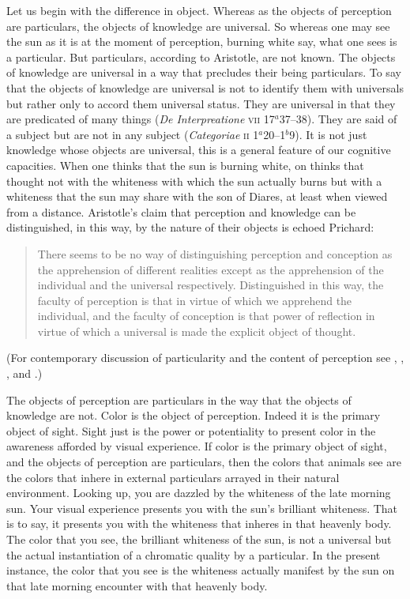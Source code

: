 Let us begin with the difference in object. Whereas as the objects of perception are particulars, the objects of knowledge are universal. So whereas one may see the sun as it is at the moment of perception, burning white say, what one sees is a particular. But particulars, according to Aristotle, are not known. The objects of knowledge are universal in a way that precludes their being particulars. To say that the objects of knowledge are universal is not to identify them with universals but rather only to accord them universal status. They are universal in that they are predicated of many things (\emph{De Interpreatione} \textsc{vii} 17\( ^{a} \)37--38). They are said of a subject but are not in any subject (\emph{Categoriae} \textsc{ii} 1\( ^{a} \)20--1\( ^{b} \)9). It is not just knowledge whose objects are universal, this is a general feature of our cognitive capacities. When one thinks that the sun is burning white, on thinks that thought not with the whiteness with which the sun actually burns but with a whiteness that the sun may share with the son of Diares, at least when viewed from a distance. Aristotle's claim that perception and knowledge can be distinguished, in this way, by the nature of their objects is echoed Prichard:
\begin{quote}
	There seems to be no way of distinguishing perception and conception as the apprehension of different realities except as the apprehension of the individual and the universal respectively. Distinguished in this way, the faculty of perception is that in virtue of which we apprehend the individual, and the faculty of conception is that power of reflection in virtue of which a universal is made the explicit object of thought. \citep[]{Prichard:1909yg}
\end{quote}
(For contemporary discussion of particularity and the content of perception see \citealt{Brewer:2008fk}, \citealt{Martin:2002jb}, \citealt{Soteriou:2000iz,Soteriou:2005fk}, and \citealt{Travis:2005ys}.)

The objects of perception are particulars in the way that the objects of knowledge are not. Color is the object of perception. Indeed it is the primary object of sight. Sight just is the power or potentiality to present color in the awareness afforded by visual experience. If color is the primary object of sight, and the objects of perception are particulars, then the colors that animals see are the colors that inhere in external particulars arrayed in their natural environment. Looking up, you are dazzled by the whiteness of the late morning sun. Your visual experience presents you with the sun's brilliant whiteness. That is to say, it presents you with the whiteness that inheres in that heavenly body. The color that you see, the brilliant whiteness of the sun, is not a universal but the actual instantiation of a chromatic quality by a particular. In the present instance, the color that you see is the whiteness actually manifest by the sun on that late morning encounter with that heavenly body.

